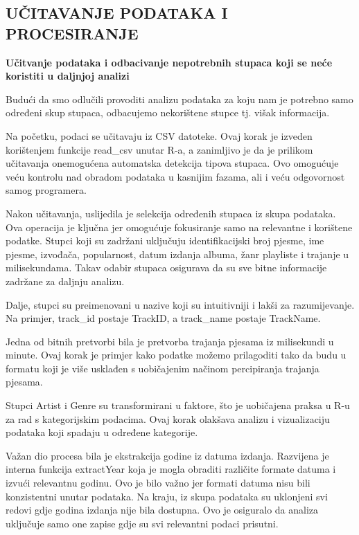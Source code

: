 \documentclass[
]{article}
\begin{document}
\hypertarget{uux10ditavanje-podataka-i-procesiranje}{%
\subsection{UČITAVANJE PODATAKA I
PROCESIRANJE}\label{uux10ditavanje-podataka-i-procesiranje}}

\textbf{Učitvanje podataka i odbacivanje nepotrebnih stupaca koji se
neće koristiti u daljnjoj analizi}

Budući da smo odlučili provoditi analizu podataka za koju nam je
potrebno samo određeni skup stupaca, odbacujemo nekorištene stupce tj.
višak informacija.

Na početku, podaci se učitavaju iz CSV datoteke. Ovaj korak je izveden
korištenjem funkcije read\_csv unutar R-a, a zanimljivo je da je
prilikom učitavanja onemogućena automatska detekcija tipova stupaca. Ovo
omogućuje veću kontrolu nad obradom podataka u kasnijim fazama, ali i
veću odgovornost samog programera.

Nakon učitavanja, uslijedila je selekcija određenih stupaca iz skupa
podataka. Ova operacija je ključna jer omogućuje fokusiranje samo na
relevantne i korištene podatke. Stupci koji su zadržani uključuju
identifikacijski broj pjesme, ime pjesme, izvođača, popularnost, datum
izdanja albuma, žanr playliste i trajanje u milisekundama. Takav odabir
stupaca osigurava da su sve bitne informacije zadržane za daljnju
analizu.

Dalje, stupci su preimenovani u nazive koji su intuitivniji i lakši za
razumijevanje. Na primjer, track\_id postaje TrackID, a track\_name
postaje TrackName.

Jedna od bitnih pretvorbi bila je pretvorba trajanja pjesama iz
milisekundi u minute. Ovaj korak je primjer kako podatke možemo
prilagoditi tako da budu u formatu koji je više usklađen s uobičajenim
načinom percipiranja trajanja pjesama.

Stupci Artist i Genre su transformirani u faktore, što je uobičajena
praksa u R-u za rad s kategorijskim podacima. Ovaj korak olakšava
analizu i vizualizaciju podataka koji spadaju u određene kategorije.

Važan dio procesa bila je ekstrakcija godine iz datuma izdanja.
Razvijena je interna funkcija extractYear koja je mogla obraditi
različite formate datuma i izvući relevantnu godinu. Ovo je bilo važno
jer formati datuma nisu bili konzistentni unutar podataka. Na kraju, iz
skupa podataka su uklonjeni svi redovi gdje godina izdanja nije bila
dostupna. Ovo je osiguralo da analiza uključuje samo one zapise gdje su
svi relevantni podaci prisutni.
\end{document}
